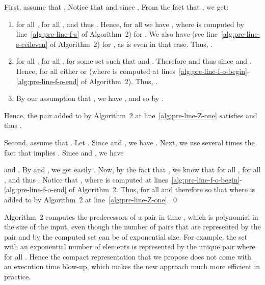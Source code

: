 \documentclass{LMCS}
\begin{document}
First, assume that . 
Notice that  and  
since ,
From the fact that ,
we get:
\begin{enumerate}[] 
\item for all , for all ,  
and thus . Hence, for all  we have
,
where  is computed by line~\ref{alg:pre-line-f-s} of Algorithm~2) for . 
We also have  (see line~\ref{alg:pre-line-s-ceileven} of Algorithm~2) 
for , as  is even in that case.
Thus, .
 
\item for all , for all ,  
for some set  such that  and . 
Therefore 
and thus 
since  and .
Hence, for all  
either  or  (where  is computed 
at lines~\ref{alg:pre-line-f-o-begin}-\ref{alg:pre-line-f-o-end} of Algorithm~2).
Thus, .

\item By our assumption that , we have , and 
so  by .
\end{enumerate}\medskip

\noindent Hence, the pair  added to  by
Algorithm~2 at line~\ref{alg:pre-line-Z-one} satisfies
 and thus
.



Second, assume that . Let . 
Since  and ,
we have . 
Next, we use several times the fact that  implies . 
Since  and , we have 
  
and  . 
By  and , we get easily .
Now, by the fact that 
, we know that
for all , for all ,  
and thus . 
Notice that ,
where  is computed at lines~\ref{alg:pre-line-f-o-begin}-\ref{alg:pre-line-f-o-end} of Algorithm~2. 
Thus,  for all  
and therefore  so that 
where  is added to  by Algorithm~2 at line~\ref{alg:pre-line-Z-one}. 
\qed


Algorithm~2 computes the predecessors of a pair 
in time , which is polynomial in the size of the input, even though
the number of pairs  that are represented by the pair 
and by the computed set  can be of exponential size.
For example, the set  
with an exponential number of elements is represented by the unique
pair  where  for all .
Hence the compact representation that we propose does not come
with an execution time blow-up, which makes the new approach much more efficient 
in practice.
\end{document}
